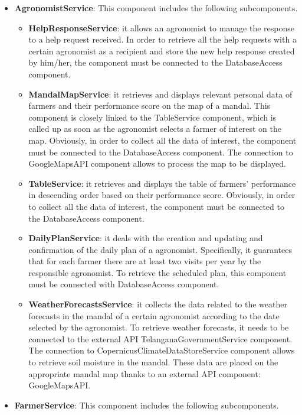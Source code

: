 \begin{itemize}
\item \textbf{AgronomistService}: This component includes the following subcomponents.

\begin{itemize}
    \item \textbf{HelpResponseService}: it allows an agronomist to manage the response to a help request received. In order to retrieve all the help requests with a certain agronomist as a recipient and store the new help response created by him/her, the component must be connected to the DatabaseAccess component. 
    \item \textbf{MandalMapService}: it retrieves and displays relevant personal data of farmers and their performance score on the map of a mandal. This component is closely linked to the TableService component, which is called up as soon as the agronomist selects a farmer of interest on the map. Obviously, in order to collect all the data of interest, the component must be connected to the DatabaseAccess component. 
    The connection to GoogleMapsAPI component allows to process the map to be displayed.
    \item \textbf{TableService}: it retrieves and displays the table of farmers’ performance in descending order based on their performance score. Obviously, in order to collect all the data of interest, the component must be connected to the DatabaseAccess component.
    \item \textbf{DailyPlanService}: it deals with the creation and updating and confirmation of the daily plan of a agronomist. Specifically, it guarantees that for each farmer there are at least two visits per year by the responsible agronomist. To retrieve the scheduled plan, this component must be connected with DatabaseAccess component.
    \item \textbf{WeatherForecastsService}: it collects the data related to the weather forecasts in the mandal of a certain agronomist according to the date selected by the agronomist. To retrieve weather forecasts, it needs to be connected to the external API TelanganaGovernmentService component. 
    The connection to CopernicusClimateDataStoreService component allows to retrieve soil moisture in the mandal.
    These data are placed on the appropriate mandal map thanks to an external API component: GoogleMapsAPI.
\end{itemize}

\item \textbf{FarmerService}: This component includes the following subcomponents.


\end{itemize}
